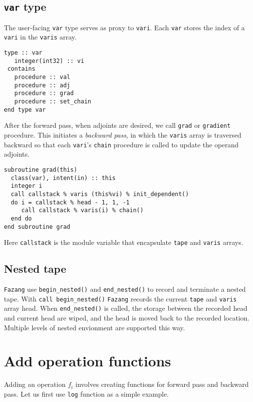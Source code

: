 \documentclass[12pt, reqno, oneside]{amsbook}
\numberwithin{equation}{chapter}
\begin{document}
\section{\texttt{var} type}
\label{sec:org68afdb6}
The user-facing \texttt{var} type serves as proxy to \texttt{vari}. Each \texttt{var}
stores the index of a \texttt{vari} in the \texttt{varis} array.
\begin{verbatim}
type :: var
   integer(int32) :: vi
 contains
   procedure :: val
   procedure :: adj
   procedure :: grad
   procedure :: set_chain
end type var
\end{verbatim}
After the forward pass, when adjoints are desired, we call \texttt{grad} or
\texttt{gradient} procedure. This initiates a \emph{backward pass}, in which  the
\texttt{varis} array is traversed backward
so that each \texttt{vari}'s \texttt{chain} procedure is called to update the
operand adjoints.
\begin{verbatim}
subroutine grad(this)
  class(var), intent(in) :: this
  integer i
  call callstack % varis (this%vi) % init_dependent()
  do i = callstack % head - 1, 1, -1
     call callstack % varis(i) % chain()
  end do
end subroutine grad
\end{verbatim}
Here \texttt{callstack} is the module variable that encapsulate \texttt{tape} and
\texttt{varis} arrays.

\section{Nested tape}
\label{sec:org3118fbe}
\texttt{Fazang} use \texttt{begin\_nested()} and \texttt{end\_nested()} to record and
terminate a nested tape. With \texttt{call begin\_nested()} \texttt{Fazang} records
the current \texttt{tape} and \texttt{varis} array head. When \texttt{end\_nested()} is
called, the storage between the recorded head and current head are
wiped, and the head is moved back to the recorded location. Multiple
levels of nested envionment are supported this way.

\chapter{Add operation functions}
\label{sec:orgea55628}
Adding an operation \(f_i\) involves creating functions for forward
pass and backward pass. Let us first use \texttt{log} function as a simple
example.
\end{document}
